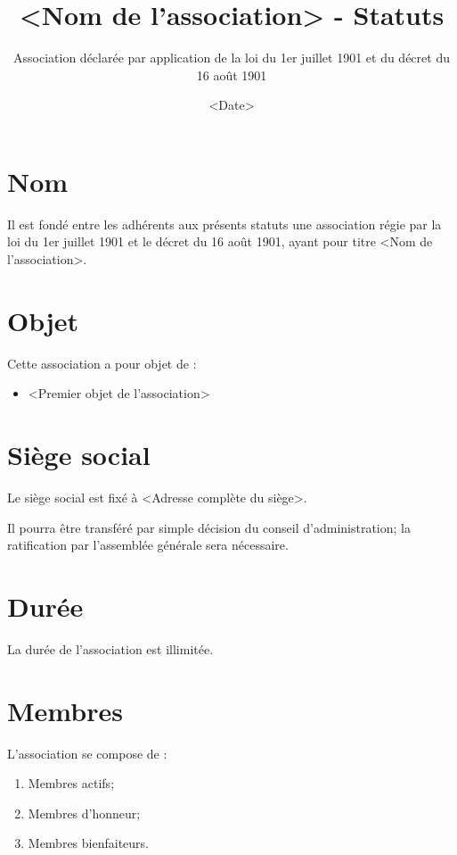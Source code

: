 \documentclass[12pt]{constitution}
\begin{document}
\title{<Nom de l'association> - Statuts}
\author{Association déclarée par application de la loi du 1er juillet 1901 et du décret du 16 août 1901}
\date{<Date>}
\maketitle
\newpage
	
\section{Nom}
Il est fondé entre les adhérents aux présents statuts une association régie par la loi du 1er juillet 1901 et le décret du 16 août 1901, ayant pour titre <Nom de l'association>.

\section{Objet}
Cette association a pour objet de :
\begin{itemize}
	\item <Premier objet de l'association>
\end{itemize}

\section{Siège social}
Le siège social est fixé à <Adresse complète du siège>.

Il pourra être transféré par simple décision du conseil d'administration; la ratification par l’assemblée générale sera nécessaire.

\section{Durée}
La durée de l’association est illimitée.


\section{Membres}
L'association se compose de :
\begin{enumerate}
	\item Membres actifs;
	\item Membres d'honneur;
	\item Membres bienfaiteurs.
\end{enumerate}
\end{document}

